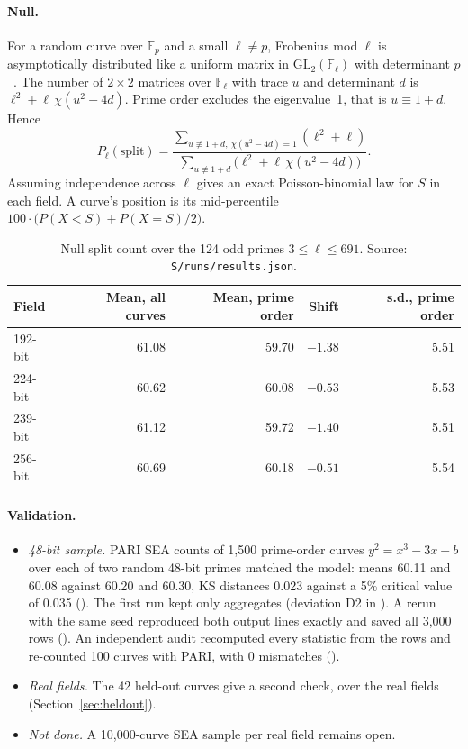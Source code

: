 \documentclass[11pt,a4paper]{article}
\theoremstyle{plain}
\newcommand{\FF}{\mathbb{F}}
\newcommand{\GL}{\mathrm{GL}}
\begin{document}
\paragraph{Null.} For a random curve over $\FF_p$ and a small $\ell \ne p$,
Frobenius mod $\ell$ is asymptotically distributed like a uniform matrix in
$\GL_2(\FF_\ell)$ with determinant $p$~\cite{castryck-hubrechts}. The number of
$2\times 2$ matrices over $\FF_\ell$ with trace $u$ and determinant $d$ is
$\ell^2 + \ell\,\chi(u^2 - 4d)$. Prime order excludes the eigenvalue~1, that
is $u \equiv 1 + d$. Hence
\begin{equation}
  P_\ell(\text{split}) =
  \frac{\sum_{u \not\equiv 1+d,\ \chi(u^2-4d)=1} (\ell^2 + \ell)}
       {\sum_{u \not\equiv 1+d} \bigl(\ell^2 + \ell\,\chi(u^2-4d)\bigr)} .
\end{equation}
Assuming independence across $\ell$ gives an exact Poisson-binomial law for
$S$ in each field. A curve's position is its mid-percentile
$100\cdot\bigl(P(X < S) + P(X = S)/2\bigr)$.

\begin{table}[ht]
\centering
\begin{tabular}{lrrrr}
\toprule
Field & Mean, all curves & Mean, prime order & Shift & s.d., prime order \\
\midrule
192-bit & 61.08 & 59.70 & $-1.38$ & 5.51 \\
224-bit & 60.62 & 60.08 & $-0.53$ & 5.53 \\
239-bit & 61.12 & 59.72 & $-1.40$ & 5.51 \\
256-bit & 60.69 & 60.18 & $-0.51$ & 5.54 \\
\bottomrule
\end{tabular}
\caption{Null split count over the 124 odd primes $3 \le \ell \le 691$.
Source: \texttt{S/runs/results.json}.}
\label{tab:null}
\end{table}

\paragraph{Validation.}
\begin{itemize}
\item \emph{48-bit sample.} PARI SEA counts of 1{,}500 prime-order curves
  $y^2 = x^3 - 3x + b$ over each of two random 48-bit primes matched the model:
  means 60.11 and 60.08 against 60.20 and 60.30, KS distances 0.023 against a
  5\% critical value of 0.035 (). The
  first run kept only aggregates (deviation D2 in ). A
  rerun with the same seed reproduced both output lines exactly and saved all
  3{,}000 rows (). An independent
  audit recomputed every statistic from the rows and re-counted 100 curves
  with PARI, with 0 mismatches ().
\item \emph{Real fields.} The 42 held-out curves give a second check, over the
  real fields (Section~\ref{sec:heldout}).
\item \emph{Not done.} A 10{,}000-curve SEA sample per real field remains open.
\end{itemize}
\end{document}
